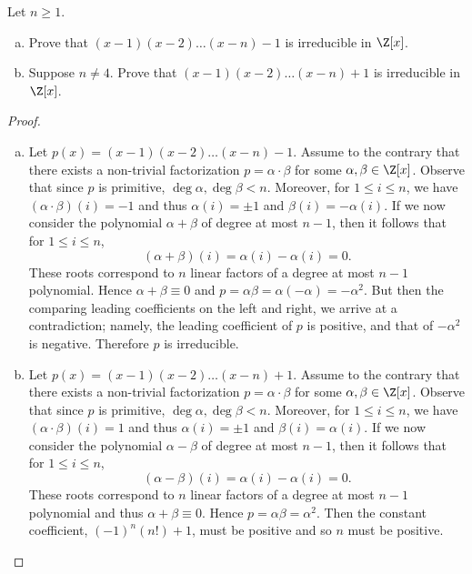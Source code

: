 \documentclass[10pt]{amsart}
\begin{document}
\begin{thm}
  Let $n \geq 1$.
  \begin{enumerate}[(a)]
  \item
    Prove that $(x-1)(x-2)\ldots(x-n) - 1$ is irreducible in $\Z[x]$.
  \item
    Suppose $n \neq 4$.  Prove that $(x-1)(x-2)\ldots(x-n) + 1$ is irreducible in $\Z[x]$.
  \end{enumerate}
  
  \begin{proof}
    \begin{enumerate}[(a)]
    \item
      Let $p(x) = (x-1)(x-2)\ldots(x-n) - 1$.
      Assume to the contrary that there exists a non-trivial factorization $p = \alpha\cdot\beta$ for some $\alpha, \beta \in \Z[x]$.
      Observe that since $p$ is primitive, $\deg{\alpha}, \deg{\beta} < n$.
      Moreover, for $1 \leq i \leq n$, we have $(\alpha\cdot\beta)(i) = -1$ and thus $\alpha(i) = \pm 1$ and $\beta(i) = - \alpha(i)$.
      If we now consider the polynomial $\alpha + \beta$ of degree at most $n-1$, then it follows that for $1 \leq i \leq n$, 
      $$(\alpha + \beta)(i) = \alpha(i) - \alpha(i) = 0.$$
      These roots correspond to $n$ linear factors of a degree at most $n-1$ polynomial.
      Hence $\alpha + \beta \equiv 0$ and $p = \alpha\beta = \alpha(-\alpha) = -\alpha^2$.
      But then the comparing leading coefficients on the left and right, we arrive at a contradiction; namely, the leading coefficient of $p$ is positive, and that of $-\alpha^2$ is negative.
      Therefore $p$ is irreducible.
    \item
      Let $p(x) = (x-1)(x-2)\ldots(x-n) + 1$.
      Assume to the contrary that there exists a non-trivial factorization $p = \alpha\cdot\beta$ for some $\alpha, \beta \in \Z[x]$.
      Observe that since $p$ is primitive, $\deg{\alpha}, \deg{\beta} < n$.
      Moreover, for $1 \leq i \leq n$, we have $(\alpha\cdot\beta)(i) = 1$ and thus $\alpha(i) = \pm 1$ and $\beta(i) = \alpha(i)$.
      If we now consider the polynomial $\alpha - \beta$ of degree at most $n-1$, then it follows that for $1 \leq i \leq n$, 
      $$(\alpha - \beta)(i) = \alpha(i) - \alpha(i) = 0.$$
      These roots correspond to $n$ linear factors of a degree at most $n-1$ polynomial and thus $\alpha + \beta \equiv 0$.  
      Hence $p = \alpha\beta = \alpha^2$.
      Then the constant coefficient, $(-1)^n(n!) + 1$, must be positive and so $n$ must be positive.
      

\end{enumerate}
\end{proof}
\end{thm}
\end{document}
